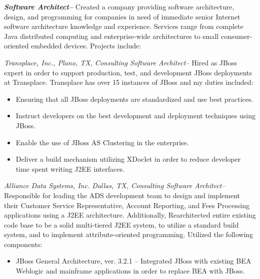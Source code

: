 \documentclass[10pt]{report}
\begin{document}
	\begin{description}

		\item{\bf{\emph{Software Architect--}}} Created a company providing software architecture, design, and programming for companies in need of immediate senior Internet software architecture knowledge and experience.   Services range from complete Java distributed computing and enterprise-wide architectures to small consumer-oriented embedded devices.  Projects include:

    	\begin{list}{-}{}

			\item{\emph{Transplace, Inc., Plano, TX, Consulting Software Architect--}}
			Hired as JBoss expert in order to support production, test, and
			development JBoss deployments at Transplace.  Transplace has over 15
			instances of JBoss and my duties included:

			\begin{itemize}

				\item Ensuring that all JBoss deployments are standardized and use best practices.

				\item Instruct developers on the best development and deployment techniques using JBoss.

				\item Enable the use of JBoss AS Clustering in the enterprise.

				\item Deliver a build mechanism utilizing XDoclet in order to reduce
				developer time spent writing J2EE interfaces.

			\end{itemize}

			\item{\emph{Alliance Data Systems, Inc. Dallas, TX, Consulting Software
			Architect--}}  Responsible for leading the ADS development team to design
			and implement their Customer Service Representative, Account Reporting,
			and Fees Processing applications using a J2EE architecture.
			Additionally, Rearchitected entire existing code base to be a solid
			multi-tiered J2EE system, to utilize a standard build system, and to
			implement attribute-oriented programming.  Utilized the following
			components:

			\begin{itemize}

				\item{JBoss General Architecture, ver. 3.2.1 --} Integrated JBoss with existing BEA Weblogic and mainframe applications in order to replace BEA with JBoss.


\end{itemize}
\end{list}
\end{description}
\end{document}

